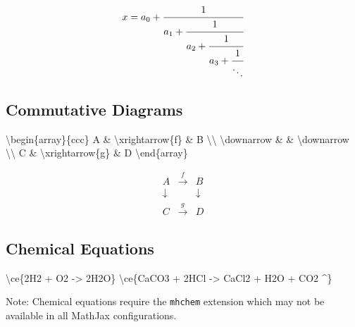 \documentclass[
  letterpaper,
  DIV=11,
  numbers=noendperiod]{scrartcl}
\newenvironment{Shaded}{\begin{snugshade}}{\end{snugshade}}
\newcommand{\ExtensionTok}[1]{\textcolor[rgb]{0.00,0.23,0.31}{#1}}
\newcommand{\KeywordTok}[1]{\textcolor[rgb]{0.00,0.23,0.31}{#1}}
\newcommand{\NormalTok}[1]{\textcolor[rgb]{0.00,0.23,0.31}{#1}}
\newcommand{\SpecialCharTok}[1]{\textcolor[rgb]{0.37,0.37,0.37}{#1}}
\newcommand{\SpecialStringTok}[1]{\textcolor[rgb]{0.13,0.47,0.30}{#1}}
\begin{document}
\[x = a_0 + \cfrac{1}{a_1 + \cfrac{1}{a_2 + \cfrac{1}{a_3 + \cfrac{1}{\ddots}}}}\]

\hypertarget{commutative-diagrams}{%
\subsection{Commutative Diagrams}\label{commutative-diagrams}}

\begin{Shaded}
\begin{Highlighting}[]
\SpecialStringTok{$$}\KeywordTok{\textbackslash{}begin}\NormalTok{\{}\ExtensionTok{array}\NormalTok{\}}\SpecialStringTok{\{ccc\}}
\SpecialStringTok{A \& }\SpecialCharTok{\textbackslash{}xrightarrow}\SpecialStringTok{\{f\} \& B }\SpecialCharTok{\textbackslash{}\textbackslash{}}
\SpecialCharTok{\textbackslash{}downarrow}\SpecialStringTok{ \& \& }\SpecialCharTok{\textbackslash{}downarrow}\SpecialStringTok{ }\SpecialCharTok{\textbackslash{}\textbackslash{}}
\SpecialStringTok{C \& }\SpecialCharTok{\textbackslash{}xrightarrow}\SpecialStringTok{\{g\} \& D}
\KeywordTok{\textbackslash{}end}\NormalTok{\{}\ExtensionTok{array}\NormalTok{\}}\SpecialStringTok{$$}
\end{Highlighting}
\end{Shaded}

\[\begin{array}{ccc}
A & \xrightarrow{f} & B \\
\downarrow & & \downarrow \\
C & \xrightarrow{g} & D
\end{array}\]

\hypertarget{chemical-equations}{%
\subsection{Chemical Equations}\label{chemical-equations}}

\begin{Shaded}
\begin{Highlighting}[]
\SpecialStringTok{$$}\SpecialCharTok{\textbackslash{}ce}\SpecialStringTok{\{2H2 + O2 {-}\textgreater{} 2H2O\}$$}
\SpecialStringTok{$$}\SpecialCharTok{\textbackslash{}ce}\SpecialStringTok{\{CaCO3 + 2HCl {-}\textgreater{} CaCl2 + H2O + CO2 \^{}\}$$}
\end{Highlighting}
\end{Shaded}

Note: Chemical equations require the \texttt{mhchem} extension which may
not be available in all MathJax configurations.
\end{document}
